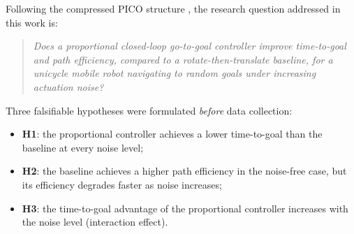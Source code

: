 \documentclass[conference]{IEEEtran}
\begin{document}
Following the compressed PICO structure \cite{bonsignorio2015toward}, the
research question addressed in this work is:

\begin{quote}
\emph{Does a proportional closed-loop go-to-goal controller improve
time-to-goal and path efficiency, compared to a rotate-then-translate
baseline, for a unicycle mobile robot navigating to random goals under
increasing actuation noise?}
\end{quote}

Three falsifiable hypotheses were formulated \emph{before} data collection:
\begin{itemize}
\item \textbf{H1}: the proportional controller achieves a lower time-to-goal
than the baseline at every noise level;
\item \textbf{H2}: the baseline achieves a higher path efficiency in the
noise-free case, but its efficiency degrades faster as noise increases;
\item \textbf{H3}: the time-to-goal advantage of the proportional controller
increases with the noise level (interaction effect).
\end{itemize}
\end{document}
